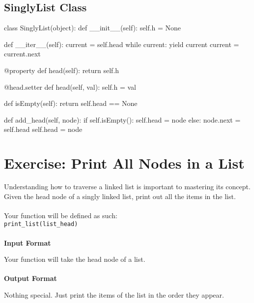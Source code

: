 \documentclass{42-en}
\begin{document}
    \section{SinglyList Class}

        \begin{42pycode}
class SinglyList(object):
    def __init__(self):
        self.h = None

    def __iter__(self):
        current = self.head
        while current:
            yield current
            current = current.next

    @property
    def head(self):
        return self.h

    @head.setter
    def head(self, val):
        self.h = val

    def isEmpty(self):
        return self.head == None

    def add_head(self, node):
        if self.isEmpty():
            self.head = node
        else:
            node.next = self.head
            self.head = node
    \end{42pycode}

\startexercices

\chapter{Exercise\exercicenumber: Print All Nodes in a List}

\exnumber{\exercicenumber}

\makeheaderfiles
    Understanding how to traverse a linked list is important to mastering
    its concept. Given the head node of a singly linked list, print out all
    the items in the list.\\
    \\
    Your function will be defined as such:\\
    \texttt{print\_list(list\_head)}\\
    \\
    \textbf{Input Format}

    Your function will take the head node of a list.\\
    \\
    \textbf{Output Format}

    Nothing special. Just print the items of the list in the order they appear.

\nextexercice
\end{document}

